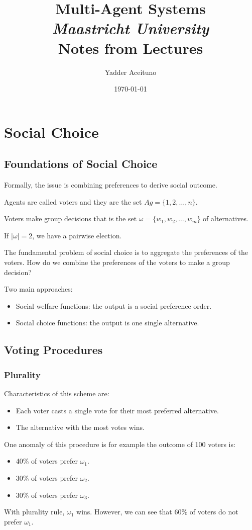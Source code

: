\documentclass[12pt,a4paper]{report}
\title{
    \vspace{2in}
    \Huge \textbf{Multi-Agent Systems} \\
    \Large \textit{Maastricht University} \\
    \vspace{0.5in}
    \large Notes from Lectures \\
    \vspace{2in}
}
\author{Yadder Aceituno}
\date{\today}
\begin{document}
\maketitle
\tableofcontents
\newpage

\chapter{Social Choice}

\section{Foundations of Social Choice}
Formally, the issue is combining preferences to derive social outcome.

\begin{definition}
    Agents are called voters and they are the set $Ag = \{1, 2, \dots, n\}$.

    Voters make group decisions that is the set $ \omega = \{w_1, w_2, \dots, w_m\}$ of alternatives.
\end{definition}

If $|\omega| = 2$, we have a pairwise election.

The fundamental problem of social choice is to aggregate the preferences of the voters.
How do we combine the preferences of the voters to make a group decision?

Two main approaches:

\begin{itemize}
    \item Social welfare functions: the output is a social preference order.
    \item Social choice functions: the output is one single alternative.
\end{itemize}

\section{Voting Procedures}

\subsection{Plurality}
Characteristics of this scheme are:

\begin{itemize}
    \item Each voter casts a single vote for their most preferred alternative.
    \item The alternative with the most votes wins.
\end{itemize}

One anomaly of this procedure is for example the outcome of 100 voters is:
\begin{itemize}
    \item 40\% of voters prefer $\omega_1$.
    \item 30\% of voters prefer $\omega_2$.
    \item 30\% of voters prefer $\omega_3$.
\end{itemize}

With plurality rule, $\omega_1$ wins. However, we can see that 60\% of voters do not prefer $\omega_1$.
\end{document}

